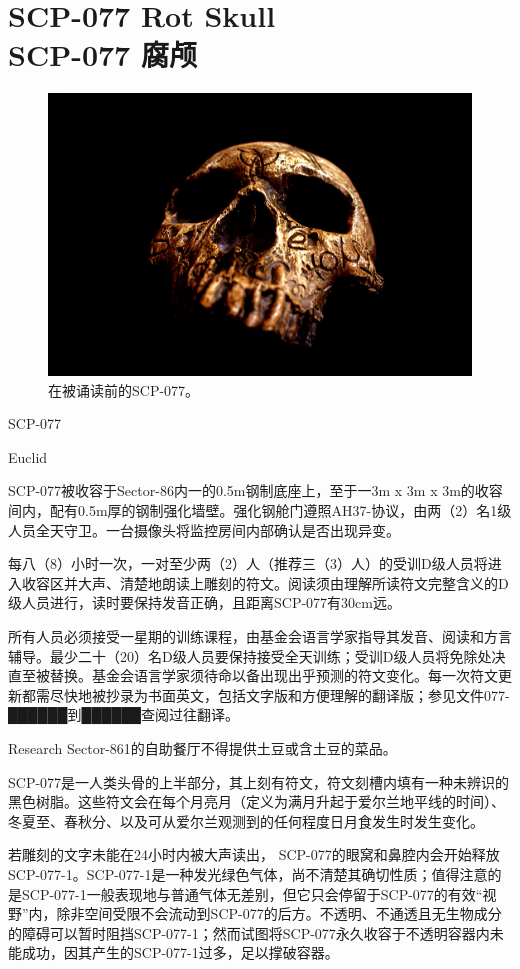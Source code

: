 \chapter[SCP-077 腐颅]{
    SCP-077 Rot Skull\\
    SCP-077 腐颅
}

\label{chap:SCP-077}

\begin{figure}[H]
    \centering
    \includegraphics[width=0.5\linewidth]{images/SCP.077.jpg}
    \caption*{在被诵读前的SCP-077。}
\end{figure}

SCP-077

Euclid

SCP-077被收容于Sector-86内一的0.5m钢制底座上，至于一3m x 3m x 3m的收容间内，配有0.5m厚的钢制强化墙壁。强化钢舱门遵照AH37-协议，由两（2）名1级人员全天守卫。一台摄像头将监控房间内部确认是否出现异变。

每八（8）小时一次，一对至少两（2）人（推荐三（3）人）的受训D级人员将进入收容区并大声、清楚地朗读上雕刻的符文。阅读须由理解所读符文完整含义的D级人员进行，读时要保持发音正确，且距离SCP-077有30cm远。

所有人员必须接受一星期的训练课程，由基金会语言学家指导其发音、阅读和方言辅导。最少二十（20）名D级人员要保持接受全天训练；受训D级人员将免除处决直至被替换。基金会语言学家须待命以备出现出乎预测的符文变化。每一次符文更新都需尽快地被抄录为书面英文，包括文字版和方便理解的翻译版；参见文件077-██████到██████查阅过往翻译。

Research Sector-861的自助餐厅不得提供土豆或含土豆的菜品。

SCP-077是一人类头骨的上半部分，其上刻有符文，符文刻槽内填有一种未辨识的黑色树脂。这些符文会在每个月亮月（定义为满月升起于爱尔兰地平线的时间）、冬夏至、春秋分、以及可从爱尔兰观测到的任何程度日月食发生时发生变化。

若雕刻的文字未能在24小时内被大声读出， SCP-077的眼窝和鼻腔内会开始释放SCP-077-1。SCP-077-1是一种发光绿色气体，尚不清楚其确切性质；值得注意的是SCP-077-1一般表现地与普通气体无差别，但它只会停留于SCP-077的有效“视野”内，除非空间受限不会流动到SCP-077的后方。不透明、不通透且无生物成分的障碍可以暂时阻挡SCP-077-1；然而试图将SCP-077永久收容于不透明容器内未能成功，因其产生的SCP-077-1过多，足以撑破容器。

